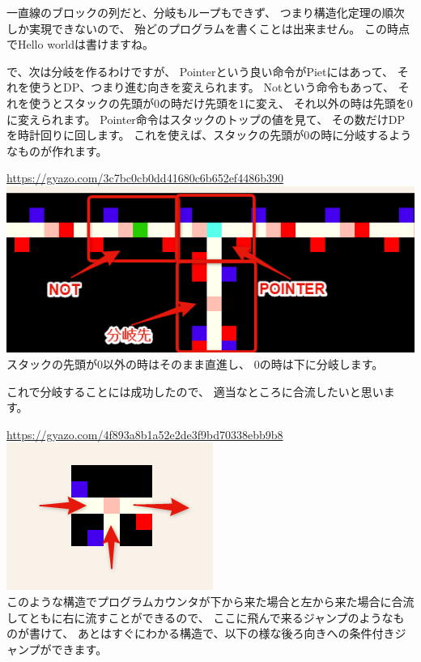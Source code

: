 一直線のブロックの列だと、分岐もループもできず、
つまり構造化定理の順次しか実現できないので、
殆どのプログラムを書くことは出来ません。 この時点でHello
worldは書けますね。

で、次は分岐を作るわけですが、 Pointerという良い命令がPietにはあって、
それを使うとDP、つまり進む向きを変えられます。 Notという命令もあって、
それを使うとスタックの先頭が0の時だけ先頭を1に変え、
それ以外の時は先頭を0に変えられます。
Pointer命令はスタックのトップの値を見て、
その数だけDPを時計回りに回します。
これを使えば、スタックの先頭が0の時に分岐するようなものが作れます。

\url{https://gyazo.com/3c7bc0cb0dd41680c6b652ef4486b390}\\
\href{https://gyazo.com/3c7bc0cb0dd41680c6b652ef4486b390}{\includegraphics[width=\textwidth]{images/3c7bc0cb0dd41680c6b652ef4486b390.png}} \\
スタックの先頭が0以外の時はそのまま直進し、
0の時は下に分岐します。

これで分岐することには成功したので、
適当なところに合流したいと思います。

\url{https://gyazo.com/4f893a8b1a52e2de3f9bd70338ebb9b8}\\
\href{https://gyazo.com/4f893a8b1a52e2de3f9bd70338ebb9b8}{\includegraphics{images/4f893a8b1a52e2de3f9bd70338ebb9b8.png}} \\
このような構造でプログラムカウンタが下から来た場合と左から来た場合に合流してともに右に流すことができるので、
ここに飛んで来るジャンプのようなものが書けて、
あとはすぐにわかる構造で、以下の様な後ろ向きへの条件付きジャンプができます。

